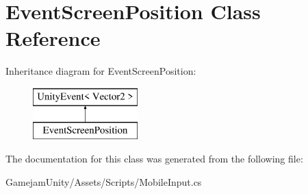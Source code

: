 \hypertarget{class_event_screen_position}{}\section{Event\+Screen\+Position Class Reference}
\label{class_event_screen_position}
Inheritance diagram for Event\+Screen\+Position\+:\begin{figure}[H]
\begin{center}
\leavevmode
\includegraphics[height=2.000000cm]{class_event_screen_position}
\end{center}
\end{figure}


The documentation for this class was generated from the following file\+:\begin{DoxyCompactItemize}
\item 
Gamejam\+Unity/\+Assets/\+Scripts/Mobile\+Input.\+cs\end{DoxyCompactItemize}
